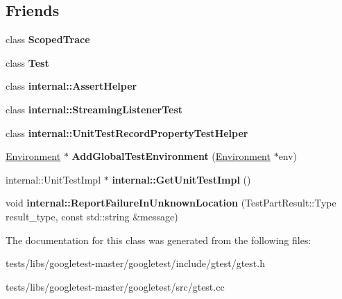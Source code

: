 \subsection*{Friends}
\begin{DoxyCompactItemize}
\item 
\mbox{\label{classtesting_1_1UnitTest_ada54bdd5bdc24f39b9ca16807326654a}} 
class {\bfseries Scoped\+Trace}
\item 
\mbox{\label{classtesting_1_1UnitTest_a5b78b1c2e1fa07ffed92da365593eaa4}} 
class {\bfseries Test}
\item 
\mbox{\label{classtesting_1_1UnitTest_a183151aa061362c87572e743fe233db1}} 
class {\bfseries internal\+::\+Assert\+Helper}
\item 
\mbox{\label{classtesting_1_1UnitTest_adc037d188dab349a94868991955c9cd4}} 
class {\bfseries internal\+::\+Streaming\+Listener\+Test}
\item 
\mbox{\label{classtesting_1_1UnitTest_ae970f89a9f477a349fe5778be85ef42e}} 
class {\bfseries internal\+::\+Unit\+Test\+Record\+Property\+Test\+Helper}
\item 
\mbox{\label{classtesting_1_1UnitTest_a5ec26e4c31220ff8e769cc09689a4d6d}} 
\hyperlink{classtesting_1_1Environment}{Environment} $\ast$ {\bfseries Add\+Global\+Test\+Environment} (\hyperlink{classtesting_1_1Environment}{Environment} $\ast$env)
\item 
\mbox{\label{classtesting_1_1UnitTest_a56e56be7066957d612e53b5c60f6ac08}} 
internal\+::\+Unit\+Test\+Impl $\ast$ {\bfseries internal\+::\+Get\+Unit\+Test\+Impl} ()
\item 
\mbox{\label{classtesting_1_1UnitTest_a73f5a158c13793b90c80d854c9a75120}} 
void {\bfseries internal\+::\+Report\+Failure\+In\+Unknown\+Location} (Test\+Part\+Result\+::\+Type result\+\_\+type, const std\+::string \&message)
\end{DoxyCompactItemize}


The documentation for this class was generated from the following files\+:\begin{DoxyCompactItemize}
\item 
tests/libs/googletest-\/master/googletest/include/gtest/gtest.\+h\item 
tests/libs/googletest-\/master/googletest/src/gtest.\+cc\end{DoxyCompactItemize}

